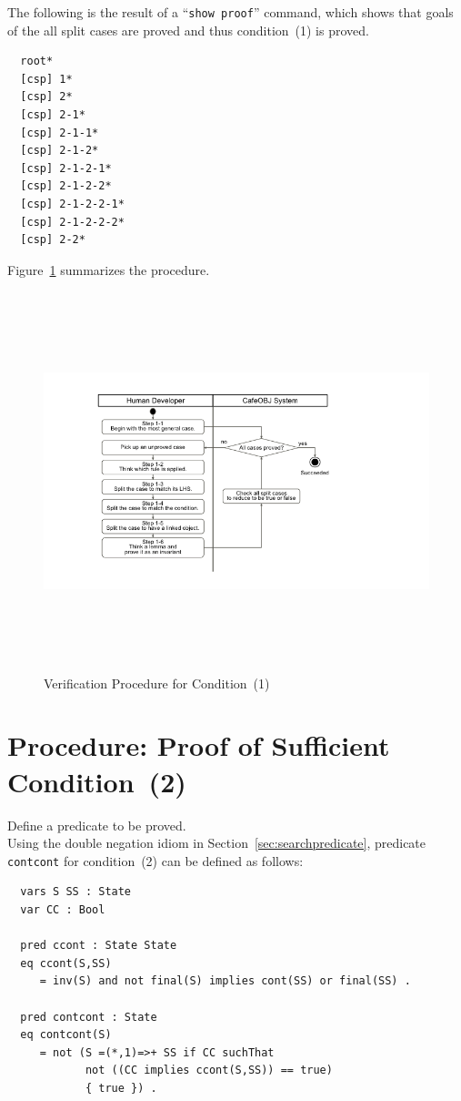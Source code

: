 \documentclass[12pt]{report}
\newcommand{\stt}[1]{{\small{\tt {#1}}}}
\begin{document}
The following is the result of a ``\stt{show proof}'' command, which shows
that goals of the all split cases are proved and thus
condition~(1) is proved.
\small
\begin{verbatim}
  root*
  [csp] 1*
  [csp] 2*
  [csp] 2-1*
  [csp] 2-1-1*
  [csp] 2-1-2*
  [csp] 2-1-2-1*
  [csp] 2-1-2-2*
  [csp] 2-1-2-2-1*
  [csp] 2-1-2-2-2*
  [csp] 2-2*
\end{verbatim}
\normalsize

Figure~\ref{fig:procedure1} summarizes the procedure.
\begin{figure}
\centering
\includegraphics[height=11cm,natwidth=720,natheight=405,clip,trim=100 55 190 40]{procedure1.png}
\caption{Verification Procedure for Condition~(1)}
\label{fig:procedure1}
\end{figure}

\section{Procedure: Proof of Sufficient Condition~(2)}
\label{sec:contcont}
 Define a predicate to be proved. \\ Using the
double negation idiom in Section~\ref{sec:searchpredicate}, predicate
{\tt contcont} for condition~(2) can be defined as follows:
\small
\begin{verbatim}
  vars S SS : State
  var CC : Bool

  pred ccont : State State
  eq ccont(S,SS)
     = inv(S) and not final(S) implies cont(SS) or final(SS) .

  pred contcont : State
  eq contcont(S)
     = not (S =(*,1)=>+ SS if CC suchThat
            not ((CC implies ccont(S,SS)) == true)
            { true }) .
\end{verbatim}
\normalsize
\end{document}
